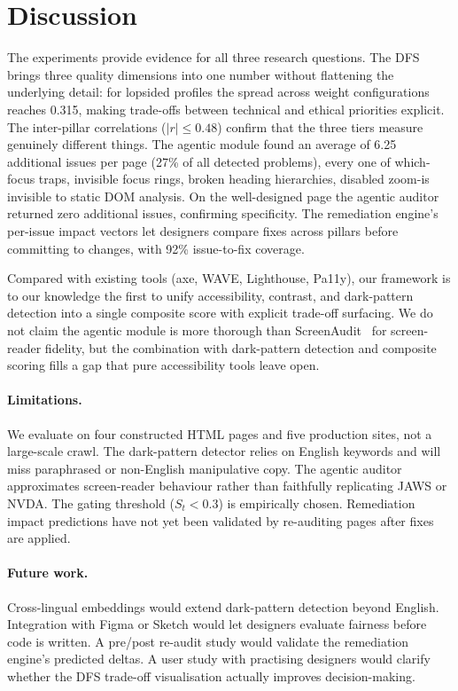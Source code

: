 \documentclass[runningheads]{llncs}
\begin{document}
\section{Discussion}

The experiments provide evidence for all three research questions.
The DFS brings three quality dimensions into one number without flattening the underlying detail: for lopsided profiles the spread across weight configurations reaches 0.315, making trade-offs between technical and ethical priorities explicit. The inter-pillar correlations ($|r| \leq 0.48$) confirm that the three tiers measure genuinely different things.
The agentic module found an average of 6.25 additional issues per page (27\% of all detected problems), every one of which-focus traps, invisible focus rings, broken heading hierarchies, disabled zoom-is invisible to static DOM analysis. On the well-designed page the agentic auditor returned zero additional issues, confirming specificity.
The remediation engine's per-issue impact vectors let designers compare fixes across pillars before committing to changes, with 92\% issue-to-fix coverage.

Compared with existing tools (axe, WAVE, Lighthouse, Pa11y), our framework is to our knowledge the first to unify accessibility, contrast, and dark-pattern detection into a single composite score with explicit trade-off surfacing. We do not claim the agentic module is more thorough than ScreenAudit~\cite{screenaudit} for screen-reader fidelity, but the combination with dark-pattern detection and composite scoring fills a gap that pure accessibility tools leave open.

\paragraph{Limitations.}
We evaluate on four constructed HTML pages and five production sites, not a large-scale crawl. The dark-pattern detector relies on English keywords and will miss paraphrased or non-English manipulative copy. The agentic auditor approximates screen-reader behaviour rather than faithfully replicating JAWS or NVDA. The gating threshold ($S_t < 0.3$) is empirically chosen. Remediation impact predictions have not yet been validated by re-auditing pages after fixes are applied.

\paragraph{Future work.}
Cross-lingual embeddings would extend dark-pattern detection beyond English. Integration with Figma or Sketch would let designers evaluate fairness before code is written. A pre/post re-audit study would validate the remediation engine's predicted deltas. A user study with practising designers would clarify whether the DFS trade-off visualisation actually improves decision-making.
\end{document}
